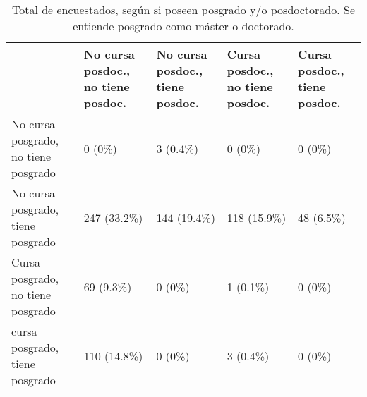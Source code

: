 \begin{table}[ht]
\centering
\begin{tabular}{p{3cm}|p{2cm}|p{2cm}|p{2cm}|p{2cm}}
  \hline
 & No cursa posdoc., no tiene posdoc. & No cursa posdoc., tiene posdoc. & Cursa posdoc., no tiene posdoc. & Cursa posdoc., tiene posdoc. \\ 
  \hline
No cursa posgrado, no tiene posgrado & 0 (0\%) & 3 (0.4\%) & 0 (0\%) & 0 (0\%) \\ 
  No cursa posgrado, tiene posgrado & 247 (33.2\%) & 144 (19.4\%) & 118 (15.9\%) & 48 (6.5\%) \\ 
  Cursa posgrado, no tiene posgrado & 69 (9.3\%) & 0 (0\%) & 1 (0.1\%) & 0 (0\%) \\ 
  cursa posgrado, tiene posgrado & 110 (14.8\%) & 0 (0\%) & 3 (0.4\%) & 0 (0\%) \\ 
   \hline
\end{tabular}
\caption{Total de encuestados, según si poseen posgrado y/o posdoctorado. Se entiende posgrado como máster o doctorado.} 
\label{tab:count}
\end{table}
